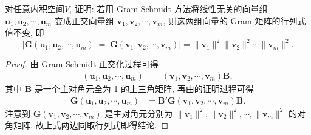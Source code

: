 \documentclass[../../main.tex]{subfiles}
\begin{document}
\begin{proposition}\label{proposition:例9.15}
对任意内积空间$V$,
证明: 若用 Gram-Schmidt 方法将线性无关的向量组 $\boldsymbol{u}_1,\boldsymbol{u}_2,\cdots,\boldsymbol{u}_m$ 变成正交向量组 $\boldsymbol{v}_1,\boldsymbol{v}_2,\cdots,\boldsymbol{v}_m$, 则这两组向量的 Gram 矩阵的行列式值不变, 即
\[
|\boldsymbol{G}(\boldsymbol{u}_1,\boldsymbol{u}_2,\cdots,\boldsymbol{u}_m)| = |\boldsymbol{G}(\boldsymbol{v}_1,\boldsymbol{v}_2,\cdots,\boldsymbol{v}_m)| = \|\boldsymbol{v}_1\|^2\|\boldsymbol{v}_2\|^2\cdots\|\boldsymbol{v}_m\|^2.
\]
\end{proposition}
\begin{proof}
由 \hyperref[theorem:Gram-Schmidt正交化方法]{Gram-Schmidt 正交化过程}可得
\begin{align*}
(\boldsymbol{u}_1,\boldsymbol{u}_2,\cdots,\boldsymbol{u}_m) &= (\boldsymbol{v}_1,\boldsymbol{v}_2,\cdots,\boldsymbol{v}_m)\boldsymbol{B},
\end{align*}
其中 $\boldsymbol{B}$ 是一个主对角元全为 1 的上三角矩阵, 再由的证明过程可得
\begin{align*}
\boldsymbol{G}(\boldsymbol{u}_1,\boldsymbol{u}_2,\cdots,\boldsymbol{u}_m) &= \boldsymbol{B}'\boldsymbol{G}(\boldsymbol{v}_1,\boldsymbol{v}_2,\cdots,\boldsymbol{v}_m)\boldsymbol{B}.
\end{align*}
注意到 $\boldsymbol{G}(\boldsymbol{v}_1,\boldsymbol{v}_2,\cdots,\boldsymbol{v}_m)$ 是主对角元分别为 $\|\boldsymbol{v}_1\|^2,\|\boldsymbol{v}_2\|^2,\cdots,\|\boldsymbol{v}_m\|^2$ 的对角矩阵, 故上式两边同取行列式即得结论. 
\end{proof}
\end{document}
